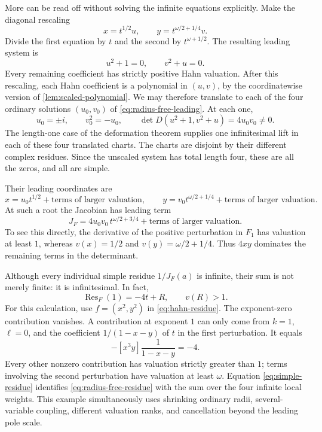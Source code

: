 \documentclass[11pt,letterpaper]{article}
\theoremstyle{definition}
\theoremstyle{remark}
\newcommand{\Res}{\operatorname{Res}}
\numberwithin{equation}{section}
\begin{document}
More can be read off without solving the infinite equations explicitly. Make the diagonal rescaling
\begin{equation}\label{eq:radius-free-scaling}
 x=t^{1/2}u,\qquad y=t^{\omega/2+1/4}v.
\end{equation}
Divide the first equation by $t$ and the second by $t^{\omega+1/2}$. The resulting leading system is
\begin{equation}\label{eq:radius-free-leading}
 u^2+1=0,\qquad v^2+u=0.
\end{equation}
Every remaining coefficient has strictly positive Hahn valuation. After this rescaling, each Hahn coefficient is a polynomial in $(u,v)$, by the coordinatewise version of \cref{lem:scaled-polynomial}. We may therefore translate to each of the four ordinary solutions $(u_0,v_0)$ of \eqref{eq:radius-free-leading}. At each one,
\[
 u_0=\pm i,\qquad v_0^2=-u_0,\qquad
 \det D(u^2+1,v^2+u)=4u_0v_0\ne0.
\]
The length-one case of the deformation theorem supplies one infinitesimal lift in each of these four translated charts. The charts are disjoint by their different complex residues. Since the unscaled system has total length four, these are all the zeros, and all are simple.

Their leading coordinates are
\begin{equation}\label{eq:radius-free-roots}
 x=u_0t^{1/2}+\text{terms of larger valuation},\qquad
 y=v_0t^{\omega/2+1/4}+\text{terms of larger valuation}.
\end{equation}
At such a root the Jacobian has leading term
\begin{equation}\label{eq:radius-free-J}
 J_F=4u_0v_0\,t^{\omega/2+3/4}
       +\text{terms of larger valuation}.
\end{equation}
To see this directly, the derivative of the positive perturbation in $F_1$ has valuation at least $1$, whereas $v(x)=1/2$ and $v(y)=\omega/2+1/4$. Thus $4xy$ dominates the remaining terms in the determinant.

Although every individual simple residue $1/J_F(a)$ is infinite, their sum is not merely finite: it is infinitesimal. In fact,
\begin{equation}\label{eq:radius-free-residue}
 \boxed{\qquad
 \Res_F(1)=-4t+R,\qquad v(R)>1.
 \qquad}
\end{equation}
For this calculation, use $f=(x^2,y^2)$ in \eqref{eq:hahn-residue}. The exponent-zero contribution vanishes. A contribution at exponent $1$ can only come from $k=1$, $\ell=0$, and the coefficient $1/(1-x-y)$ of $t$ in the first perturbation. It equals
\[
 -[x^3y]\frac1{1-x-y}=-4.
\]
Every other nonzero contribution has valuation strictly greater than $1$; terms involving the second perturbation have valuation at least $\omega$. Equation \eqref{eq:simple-residue} identifies \eqref{eq:radius-free-residue} with the sum over the four infinite local weights. This example simultaneously uses shrinking ordinary radii, several-variable coupling, different valuation ranks, and cancellation beyond the leading pole scale.
\end{document}
